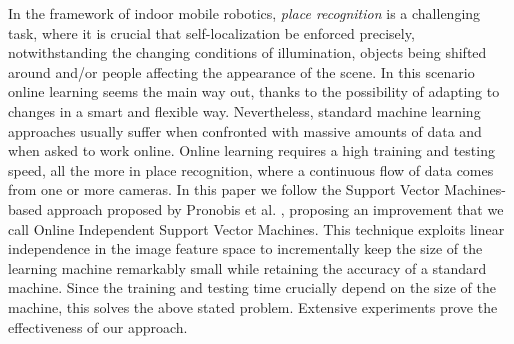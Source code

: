 In the framework of indoor mobile robotics, \emph{place recognition}
is a challenging task, where it is crucial that self-localization be
enforced precisely, notwithstanding the changing conditions of
illumination, objects being shifted around and/or people affecting the
appearance of the scene. In this scenario online learning seems the
main way out, thanks to the possibility of adapting to changes in a
smart and flexible way. Nevertheless, standard machine learning
approaches usually suffer when confronted with massive amounts of data
and when asked to work online. Online learning requires a high
training and testing speed, all the more in place recognition, where a
continuous flow of data comes from one or more cameras. In this paper
we follow the Support Vector Machines-based approach proposed by
Pronobis et al. \cite{pronobis:iros06}, proposing an improvement that
we call Online Independent Support Vector Machines. This technique
exploits linear independence in the image feature space to
incrementally keep the size of the learning machine remarkably small
while retaining the accuracy of a standard machine. Since the training
and testing time crucially depend on the size of the machine, this
solves the above stated problem. Extensive experiments prove the
effectiveness of our approach.
